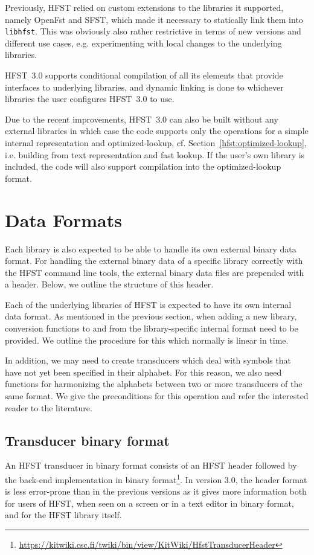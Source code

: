 \documentclass{llncs}
\begin{document}
Previously, HFST relied on custom extensions to the libraries it supported,
namely OpenFst and SFST, which made it necessary to statically link them into
\verb+libhfst+. This was obviously also rather restrictive in terms of
new versions and different use cases, e.g. experimenting with local changes to
the underlying libraries.

HFST~3.0 supports conditional compilation of all its elements that provide
interfaces to underlying libraries, and dynamic linking is done to whichever
libraries the user configures HFST~3.0 to use.

Due to the recent improvements, HFST~3.0 can also be built without any external
libraries in which case the code supports only the operations for a simple internal
representation and optimized-lookup, cf. Section~\ref{hfst:optimized-lookup},
i.e. building from text representation and fast lookup. If the user's own library is included, 
the code will also support compilation into the optimized-lookup format.


\section{Data Formats}\label{hfst:data-formats}
Each library is also expected to be able to handle its own external binary data format.
For handling the external binary data of a specific library correctly with the HFST command line tools, 
the external binary data files are prepended with a header. Below, we outline the structure 
of this header.

Each of the underlying libraries of HFST is expected to have its own internal data format. 
As mentioned in the previous section, when adding a new library, conversion functions 
to and from the library-specific internal format need to be provided. We outline the procedure
for this which normally is linear in time.

In addition, we may need to create transducers which deal with symbols that have
not yet been specified in their alphabet. For this reason, we also need functions for harmonizing 
the alphabets between two or more transducers of the same format. We give the
preconditions for this operation and refer the interested reader to the literature.

\subsection{Transducer binary format}
An HFST transducer in binary format consists of an HFST header followed by the
back-end implementation in binary 
format\footnote{\url{https://kitwiki.csc.fi/twiki/bin/view/KitWiki/HfstTransducerHeader}}. 
In version 3.0, the header
format is less error-prone than in the previous versions as it gives more 
information both for users of HFST, when seen on a screen or in a
text editor in binary format, and for the HFST library itself.
 
\end{document}
